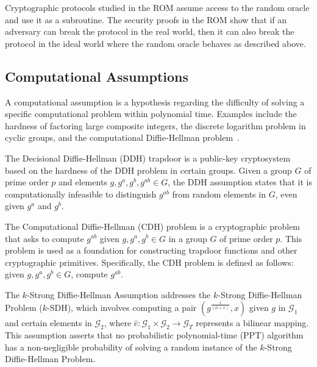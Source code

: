 \documentclass{iacrcc}
\begin{document}
Cryptographic protocols studied in the ROM assume access to the random oracle and use it as a subroutine. The security proofs in the ROM show that if an adversary can break the protocol in the real world, then it can also break the protocol in the ideal world where the random oracle behaves as described above.

\subsection{Computational Assumptions}

A computational assumption is a hypothesis regarding the difficulty of solving a specific computational problem within polynomial time. Examples include the hardness of factoring large composite integers, the discrete logarithm problem in cyclic groups, and the computational Diffie-Hellman problem~\cite{DifHel76}.

\begin{definition}
The Decisional Diffie-Hellman (DDH) trapdoor is a public-key cryptosystem based on the hardness of the DDH problem in certain groups. Given a group $G$ of prime order $p$ and elements $g, g^a, g^b, g^{ab} \in G$, the DDH assumption states that it is computationally infeasible to distinguish $g^{ab}$ from random elements in $G$, even given $g^a$ and $g^b$.
\end{definition}

\begin{definition}
The Computational Diffie-Hellman (CDH) problem is a cryptographic problem that asks to compute $g^{ab}$ given $g, g^a, g^b \in G$ in a group $G$ of prime order $p$. This problem is used as a foundation for constructing trapdoor functions and other cryptographic primitives. Specifically, the CDH problem is defined as follows: given $g, g^a, g^b \in G$, compute $g^{ab}$.
\end{definition}

\begin{definition}
The $k$-Strong Diffie-Hellman Assumption addresses the $k$-Strong Diffie-Hellman Problem ($k$-SDH), which involves computing a pair $(g^{\frac{1}{(\phi+x)}}, x)$ given $g$ in $\mathcal{G}_1$ and certain elements in $\mathcal{G}_2$, where $\hat{e}: \mathcal{G}_1 \times \mathcal{G}_2 \rightarrow \mathcal{G}_T$ represents a bilinear mapping. This assumption asserts that no probabilistic polynomial-time (PPT) algorithm has a non-negligible probability of solving a random instance of the $k$-Strong Diffie-Hellman Problem.
\end{definition}
\end{document}

